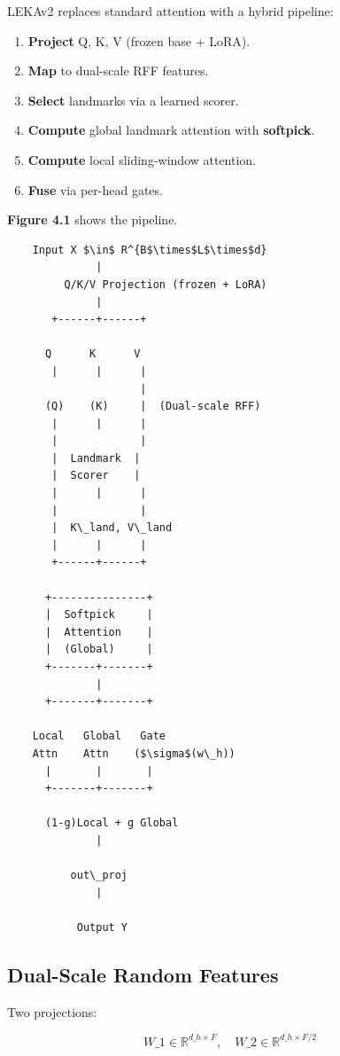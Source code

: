 LEKAv2 replaces standard attention with a hybrid pipeline:

\begin{enumerate}
\item \textbf{Project} Q, K, V (frozen base + LoRA).
\item \textbf{Map} to dual-scale RFF features.
\item \textbf{Select} landmarks via a learned scorer.
\item \textbf{Compute} global landmark attention with \textbf{softpick}.
\item \textbf{Compute} local sliding-window attention.
\item \textbf{Fuse} via per-head gates.

\end{enumerate}
\textbf{Figure 4.1} shows the pipeline.

\begin{lstlisting}
    Input X $\in$ R^{B$\times$L$\times$d}
              |
         Q/K/V Projection (frozen + LoRA)
              |
       +------+------+
                      
      Q      K      V
       |      |      |
                     |
      (Q)    (K)     |  (Dual-scale RFF)
       |      |      |
       |             |
       |  Landmark  |
       |  Scorer    |
       |      |      |
       |             |
       |  K\_land, V\_land
       |      |      |
       +------+------+
               
      +---------------+
      |  Softpick     |
      |  Attention    |
      |  (Global)     |
      +-------+-------+
              |
      +-------+-------+
                       
    Local   Global   Gate
    Attn    Attn    ($\sigma$(w\_h))
      |       |       |
      +-------+-------+
               
      (1-g)Local + g Global
              |
               
          out\_proj
              |
               
           Output Y
\end{lstlisting}

\subsection{Dual-Scale Random Features}

Two projections:

\[
W\_1 \in \mathbb{R}^{d\_h \times F}, \quad W\_2 \in \mathbb{R}^{d\_h \times F/2}
\tag{4.1}
\]

